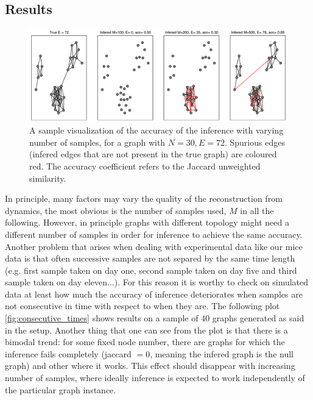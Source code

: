 \documentclass{article}
\begin{document}
\subsection{Results}
\begin{figure}[H]
    \centering
    \includegraphics[width=\linewidth]{images/sample_visualization_30_nodes.pdf}
    \caption{A sample visualization of the accuracy of the inference with varying number of samples, for a graph with $N = 30, E=72$. Spurious edges (infered edges that are not present in the true graph) are coloured red. The accuracy coefficient refers to the Jaccard unweighted similarity.}
    \label{fig:sample_visualization}
\end{figure}
In principle, many factors may vary the quality of the reconstruction from dynamics, the most obvious is the number of samples used, $M$ in all the following. However, in principle graphs with different topology might need a different number of samples in order for inference to achieve the same accuracy. Another problem that arises when dealing with experimental data like our mice data is that often successive samples are not separed by the same time length (e.g. first sample taken on day one, second sample taken on day five and third sample taken on day eleven...). For this reason it is worthy to check on simulated data at least how much the accuracy of inference deteriorates when samples are not consecutive in time with respect to when they are. The following plot \ref{fig:consecutive_times} shows results on a sample of $40$ graphs generated as said in the setup. Another thing that one can see from the plot is that there is a bimodal trend: for some fixed node number, there are graphs for which the inference fails completely (jaccard $=0$, meaning the infered graph is the null graph) and other where it works. This effect should disappear with increasing number of samples, where ideally inference is expected to work independently of the particular graph instance.
\end{document}
